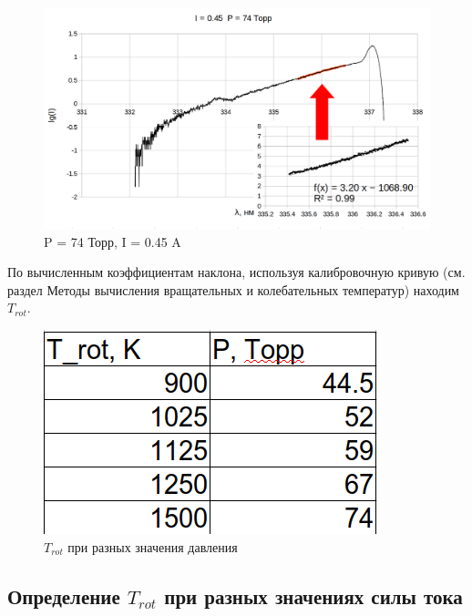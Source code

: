 \documentclass[a4paper,12pt]{article}
\begin{document}
	\begin{figure}[h]
	\begin{center}
	\begin{minipage}[h]{0.45\linewidth}
	\includegraphics[width=1\linewidth]{p_74}
	\caption{P = 74 Торр, I = 0.45 A} %
	\end{minipage}
	\hfill
	\end{center}
	\end{figure}
	
\newpage
По вычисленным коэффициентам наклона, используя калибровочную кривую (см. раздел Методы вычисления вращательных и колебательных температур) находим $T_{rot}$. 
	\begin{figure}[H]
		\begin{center}
			\includegraphics[scale=0.4]{rot_P}
			\caption{$T_{rot}$ при разных значения давления}
		\end{center}
	\end{figure}

\vspace{5cm}
	\subsection{Определение $T_{rot}$ при разных значениях силы тока}
	
\end{document}
